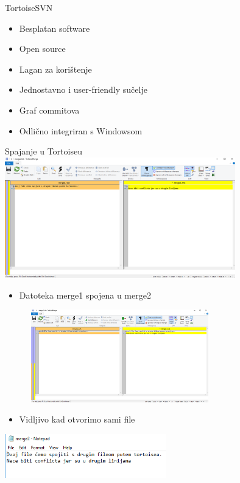 
\begin{frame}{TortoiseSVN}
\begin{itemize}
    \item Besplatan software
    \item Open source
    \item Lagan za korištenje
    \item Jednostavno i user-friendly sučelje
    \item Graf commitova
    \item Odlično integriran s Windowsom
    
    
\end{itemize}
    
\end{frame}
\begin{frame}{Spajanje u Tortoiseu}
\includegraphics[width=10cm]{tortoise1.png}
\end{frame}
\begin{frame}
\begin{itemize}
    \item\small{Datoteka merge1 spojena u merge2}
\end{itemize}
\includegraphics[height=4cm, width=10cm]{tortoise2.png}\newline
\begin{itemize}
    \item\small{Vidljivo kad otvorimo sami file}
\end{itemize}
\includegraphics[width=7cm]{tortoise3.png}
\end{frame}

